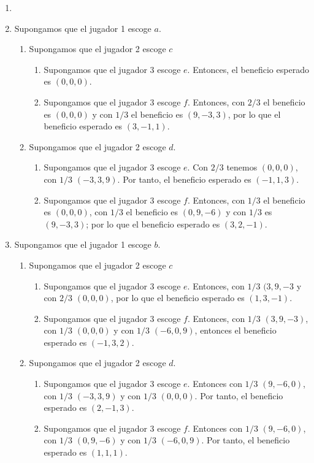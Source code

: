 \documentclass[twoside]{article}
\begin{document}
\begin{solucion}
\begin{enumerate}
\item[]
\item Supongamos que el jugador 1 escoge $a$. 
\begin{enumerate}[i]
\item Supongamos que el jugador 2 escoge $c$
\begin{enumerate}
\item Supongamos que el jugador 3 escoge $e$. Entonces, el beneficio esperado es $(0,0,0)$.
\item Supongamos que el jugador 3 escoge $f$. Entonces, con $2/3$ el beneficio es $(0,0,0)$ y con $1/3$ el beneficio es $(9,-3,3)$, por lo que el beneficio esperado es $(3,-1,1)$.
\end{enumerate}
\item Supongamos que el jugador 2 escoge $d$.
\begin{enumerate}
\item Supongamos que el jugador 3 escoge $e$. Con $2/3$ tenemos $(0,0,0)$, con $1/3$ $(-3,3,9)$. Por tanto, el beneficio esperado es $(-1,1,3)$.
\item Supongamos que el jugador 3 escoge $f$. Entonces, con $1/3$ el beneficio es $(0,0,0)$, con $1/3$ el beneficio es $(0,9,-6)$ y con $1/3$ es $(9,-3,3)$; por lo que el beneficio esperado es $(3,2,-1)$.
\end{enumerate}
\end{enumerate}
\item Supongamos que el jugador 1 escoge $b$. 
\begin{enumerate}[i]
\item Supongamos que el jugador 2 escoge $c$
\begin{enumerate}
\item Supongamos que el jugador 3 escoge $e$. Entonces, con $1/3$ $(3,9,-3$ y con $2/3$ $(0,0,0)$, por lo que el beneficio esperado es $(1,3,-1)$.
\item Supongamos que el jugador 3 escoge $f$. Entonces, con $1/3$ $(3,9,-3)$, con $1/3$ $(0,0,0)$ y con $1/3$ $(-6,0,9)$, entonces el beneficio esperado es $(-1,3,2)$.
\end{enumerate}
\item Supongamos que el jugador 2 escoge $d$.
\begin{enumerate}
\item Supongamos que el jugador 3 escoge $e$. Entonces con $1/3$ $(9,-6,0)$, con $1/3$ $(-3,3,9)$ y con $1/3$ $(0,0,0)$. Por tanto, el beneficio esperado es $(2,-1,3)$.
\item Supongamos que el jugador 3 escoge $f$. Entonces con $1/3$ $(9,-6,0)$, con $1/3$ $(0,9,-6)$ y con $1/3$ $(-6,0,9)$. Por tanto, el beneficio esperado es $(1,1,1)$.
\end{enumerate}
\end{enumerate}
\end{enumerate}

\end{solucion}
\end{document}
